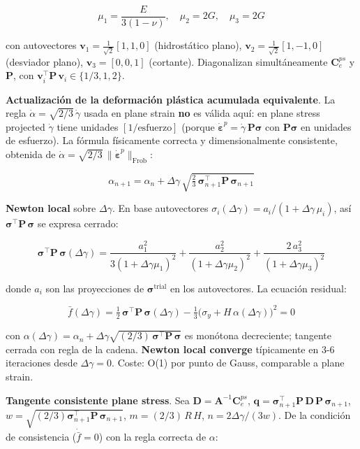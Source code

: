 \documentclass[11pt,letterpaper,oneside]{report}
\begin{document}
\[
\mu_1 = \frac{E}{3(1-\nu)}, \quad \mu_2 = 2G, \quad \mu_3 = 2G
\]

con autovectores $\mathbf v_1 = \tfrac{1}{\sqrt 2}[1,1,0]$ (hidrostático plano), $\mathbf v_2 = \tfrac{1}{\sqrt 2}[1,-1,0]$ (desviador plano), $\mathbf v_3 = [0,0,1]$ (cortante). Diagonalizan simultáneamente $\mathbf C^{ps}_e$ y $\mathbf P$, con $\mathbf v_i^\top\mathbf P\,\mathbf v_i \in \{1/3, 1, 2\}$.

\textbf{Actualización de la deformación plástica acumulada equivalente}. La regla $\dot\alpha = \sqrt{2/3}\,\dot\gamma$ usada en plane strain \textbf{no} es válida aquí: en plane stress projected $\dot\gamma$ tiene unidades $[1/\text{esfuerzo}]$ (porque $\dot{\boldsymbol\varepsilon}^p = \dot\gamma\,\mathbf P\boldsymbol\sigma$ con $\mathbf P\boldsymbol\sigma$ en unidades de esfuerzo). La fórmula físicamente correcta y dimensionalmente consistente, obtenida de $\dot\alpha = \sqrt{2/3}\,\|\dot{\boldsymbol\varepsilon}^p\|_\text{Frob}$:

\[
\alpha_{n+1} = \alpha_n + \Delta\gamma \,\sqrt{\tfrac{2}{3}\,\boldsymbol\sigma_{n+1}^\top\mathbf P\,\boldsymbol\sigma_{n+1}}
\]

\textbf{Newton local} sobre $\Delta\gamma$. En base autovectores $\sigma_i(\Delta\gamma) = a_i / (1+\Delta\gamma\,\mu_i)$, así $\boldsymbol\sigma^\top\mathbf P\,\boldsymbol\sigma$ se expresa cerrado:

\[
\boldsymbol\sigma^\top\mathbf P\,\boldsymbol\sigma(\Delta\gamma) = \frac{a_1^2}{3(1+\Delta\gamma\mu_1)^2} + \frac{a_2^2}{(1+\Delta\gamma\mu_2)^2} + \frac{2\,a_3^2}{(1+\Delta\gamma\mu_3)^2}
\]

donde $a_i$ son las proyecciones de $\boldsymbol\sigma^{\text{trial}}$ en los autovectores. La ecuación residual:

\[
\bar f(\Delta\gamma) = \tfrac{1}{2}\,\boldsymbol\sigma^\top\mathbf P\,\boldsymbol\sigma(\Delta\gamma) - \tfrac{1}{3}\big(\sigma_y + H\,\alpha(\Delta\gamma)\big)^2 = 0
\]

con $\alpha(\Delta\gamma) = \alpha_n + \Delta\gamma\sqrt{(2/3)\,\boldsymbol\sigma^\top\mathbf P\,\boldsymbol\sigma}$ es monótona decreciente; tangente cerrada con regla de la cadena. \textbf{Newton local converge} típicamente en 3-6 iteraciones desde $\Delta\gamma = 0$. Coste: O(1) por punto de Gauss, comparable a plane strain.

\textbf{Tangente consistente plane stress}. Sea $\mathbf D = \mathbf A^{-1}\mathbf C^{ps}_e$, $\mathbf q = \boldsymbol\sigma_{n+1}^\top\mathbf P\,\mathbf D\,\mathbf P\,\boldsymbol\sigma_{n+1}$, $w = \sqrt{(2/3)\boldsymbol\sigma_{n+1}^\top\mathbf P\,\boldsymbol\sigma_{n+1}}$, $m = (2/3)\,R\,H$, $n = 2\Delta\gamma/(3w)$. De la condición de consistencia ($\dot{\bar f}=0$) con la regla correcta de $\alpha$:
\end{document}
